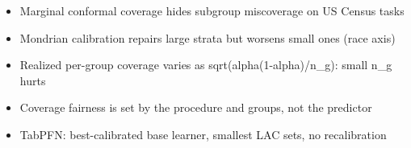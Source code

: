\begin{itemize}
\item Marginal conformal coverage hides subgroup miscoverage on US Census tasks
\item Mondrian calibration repairs large strata but worsens small ones (race axis)
\item Realized per-group coverage varies as sqrt(alpha(1-alpha)/n_g): small n_g hurts
\item Coverage fairness is set by the procedure and groups, not the predictor
\item TabPFN: best-calibrated base learner, smallest LAC sets, no recalibration
\end{itemize}
